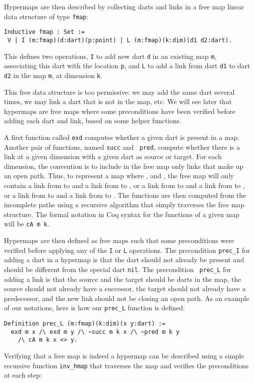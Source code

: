 \documentclass{llncs}
\begin{document}
Hypermaps are then described by collecting darts and links in a free map
linear data structure of type {\tt fmap}: 

\begin{verbatim}
Inductive fmap : Set :=
 V | I (m:fmap)(d:dart)(p:point) | L (m:fmap)(k:dim)(d1 d2:dart).
\end{verbatim}
This defines two operations, {\tt I} to add new dart {\tt d} in an
existing map {\tt m}, associating this dart with the location {\tt p},
and {\tt L} to add a link from dart {\tt d1} to dart {\tt d2} in
the map {\tt m}, at dimension {\tt k}.

This free data structure is too permissive: we
may add the same dart several times, we may link a dart that is not in
the map, etc.  We will see
later that hypermaps are free maps where some preconditions have been
verified before adding each dart and link, based on some helper functions.

A first function called {\tt exd} computes whether a given dart is
present in a map. Another pair of functions, named {\tt succ} and {\tt
  pred}, compute whether there is a link at a given dimension
with a given dart as source or target.  For each dimension, the
convention is to include in the free map only links that make up an
open path.  Thus, to represent a map where 
,  and , the
free map will only
contain a link from  to  and a link from  to
, or a link from  to  and a link from  to
, or a link from  to  and a link from  to
.  The  functions are then
computed from the incomplete paths using a recursive algorithm that
simply traverses the free map structure.
  The formal notation in Coq syntax for the 
functions of a given map  will be {\tt cA m k}. 

Hypermaps are then defined as free maps such that some preconditions
were verified before applying any of the {\tt I} or {\tt L}
operations.  The precondition {\tt prec\_I} for adding a dart in a
hypermap is that the dart should not already be present and should be
different from the special dart {\tt nil}. The precondition {\tt
  prec\_L} for adding a link is that the source and the target should
be darts in the map, the source should not already have a successor,
the target should not already have a predecessor, and the new link
should not be closing an open path.  As an example of our notations,
here is how our {\tt prec\_L} function is defined:
\begin{verbatim}
Definition prec_L (m:fmap)(k:dim)(x y:dart) :=
  exd m x /\ exd m y /\ ~succ m k x /\ ~pred m k y
    /\ cA m k x <> y.
\end{verbatim}
Verifying that a free map is indeed a hypermap can be described using
a simple recursive function {\tt inv\_hmap} that traverses the map and
verifies the preconditions at each step:
\end{document}
